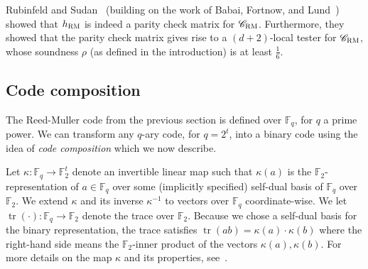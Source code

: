 \documentclass[11pt]{article}
\newtheorem{theorem}{Theorem}[section]
\theoremstyle{definition}
\newcommand{\code}{\mathscr{C}}
\newcommand{\F}{\ensuremath{\mathbb{F}}}
\newcommand{\mX}{\ensuremath{\mathcal{X}}}
\newcommand{\RM}{\ensuremath{\textsc{RM}}}
\DeclareMathOperator{\poly}{poly}
\newcommand{\eps}{\varepsilon}
\DeclareMathOperator{\tr}{tr}
\begin{document}
Rubinfeld and Sudan~\cite{rubinfeld1996robust} (building on the work of Babai, Fortnow, and Lund~\cite{babai1991non}) showed that $h_{\RM}$ is indeed a parity check matrix for $\code_{\RM}$. Furthermore, they showed that the parity check matrix gives rise to a $(d+2)$-local tester for $\code_{\RM}$, whose soundness $\rho$ (as defined in the introduction) is at least $\frac{1}{6}$. 




\subsection{Code composition}
\label{sec:code-comp}

 The Reed-Muller code from the previous section is defined over $\F_q$, for $q$ a prime power. We can transform any $q$-ary code, for $q=2^t$, into a binary code using the idea of \emph{code composition} which we now describe. 


Let $\kappa: \F_q \to \F_2^t$ denote an invertible linear map such that $\kappa(a)$ is the $\F_2$-representation of $a \in \F_q$ over some (implicitly specified) self-dual basis of $\F_q$ over $\F_2$. We extend $\kappa$ and its inverse $\kappa^{-1}$ to vectors over $\F_q$ coordinate-wise. We let $\tr(\cdot):\F_q\to\F_2$ denote the trace over $\F_2$. Because we chose a self-dual basis for the binary representation, the trace satisfies $\tr(ab)=\kappa(a)\cdot\kappa(b)$  where the right-hand side means the $\F_2$-inner product of the vectors $\kappa(a), \kappa(b)$. For more details on the map $\kappa$ and its properties, see~\cite[Section 3.3]{ji2020mip}.
\end{document}
